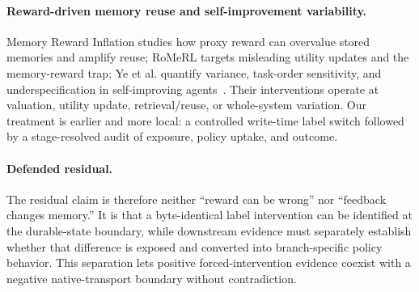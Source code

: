 \paragraph{Reward-driven memory reuse and self-improvement variability.}
Memory Reward Inflation studies how proxy reward can overvalue stored memories and amplify reuse; RoMeRL targets misleading utility updates and the memory-reward trap; Ye et al. quantify variance, task-order sensitivity, and underspecification in self-improving agents~\citep{asadolahi2026inflation,yang2026romerl,ye2026fragility}. Their interventions operate at valuation, utility update, retrieval/reuse, or whole-system variation. Our treatment is earlier and more local: a controlled write-time label switch followed by a stage-resolved audit of exposure, policy uptake, and outcome.

\paragraph{Defended residual.}
The residual claim is therefore neither ``reward can be wrong'' nor ``feedback changes memory.'' It is that a byte-identical label intervention can be identified at the durable-state boundary, while downstream evidence must separately establish whether that difference is exposed and converted into branch-specific policy behavior. This separation lets positive forced-intervention evidence coexist with a negative native-transport boundary without contradiction.
